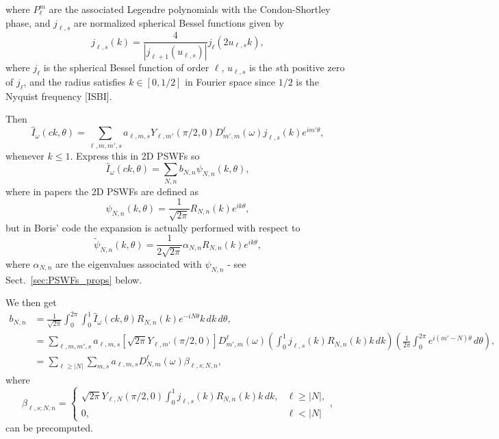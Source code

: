 \documentclass[english,11pt]{article}
\newcommand{\1}{\mathbf{1}}
\newcommand{\TODO}[1]{{\color{red}{[#1]}}}
\numberwithin{equation}{section}
\theoremstyle{plain}
\theoremstyle{definition}
\theoremstyle{remark}
\theoremstyle{plain}
\theoremstyle{remark}
\theoremstyle{plain}
\theoremstyle{plain}
\begin{document}
where $P_{\ell}^m$ are the associated Legendre polynomials with the Condon-Shortley phase, and $j_{\ell,s}$ are normalized spherical Bessel functions given by
\[ j_{\ell, s}(k) = \frac{4}{|j_{\ell+1}(u_{\ell, s})|}j_{\ell}(2u_{\ell,s} k),\]
where $j_{\ell}$ is the spherical Bessel function of order $\ell$, $u_{\ell,s}$ is the $s$th positive zero of $j_{\ell}$, and the radius satisfies $k\in[0,1/2]$ in Fourier space since $1/2$ is the Nyquist frequency [ISBI].

Then
\[ \widehat I_{\omega}(ck,\theta) = \sum_{\ell,m,m',s}a_{\ell,m,s}Y_{\ell,m'}(\pi/2,0)D_{m',m}^{\ell}(\omega)j_{\ell,s}(k)e^{im'\theta},\]
whenever $k\leq 1$. Express this in 2D PSWFs so \TODO{Eitan: I stopped here}
\[ \widehat I_{\omega}(ck,\theta) = \sum_{N,n}b_{N,n}\psi_{N,n}(k,\theta),\]
where in papers the 2D PSWFs are defined as
\[ \psi_{N,n}(k,\theta) = \frac{1}{\sqrt{2\pi}}R_{N,n}(k)e^{ik\theta},\]
but in Boris' code the expansion is actually performed with respect to
\[ \widetilde\psi_{N,n}(k,\theta) = \frac{1}{2\sqrt{2\pi}}\alpha_{N,n}R_{N,n}(k)e^{ik\theta},\]
where $\alpha_{N,n}$ are the eigenvalues associated with $\psi_{N,n}$ - see Sect.~\ref{sec:PSWFs_props} below. 

We then get
\[\begin{aligned} b_{N,n} &= \frac{1}{\sqrt{2\pi}}\int_0^{2\pi}\int_0^1\widehat I_{\omega}(ck,\theta)R_{N,n}(k)e^{-iN\theta}k\, dk\, d\theta,\\
&= \sum_{\ell,m,m',s}a_{\ell,m,s}[\sqrt{2\pi}Y_{\ell,m'}(\pi/2,0)]D_{m',m}^{\ell}(\omega)\left(\int_0^1j_{\ell,s}(k)R_{N,n}(k)k\, dk\right)\left(\frac{1}{2\pi}\int_0^{2\pi}e^{i(m'-N)\theta}\, d\theta\right),\\
&= \sum_{\ell\geq |N|}\sum_{m,s}a_{\ell,m,s}D_{N,m}^{\ell}(\omega)\beta_{\ell,s;N,n},\end{aligned}\]
where
\[ \beta_{\ell,s;N,n} = \left\{\begin{array}{ll} \sqrt{2\pi}Y_{\ell,N}(\pi/2,0)\int_0^1j_{\ell,s}(k)R_{N,n}(k)k\, dk, & \ell\geq |N|,\\ 0, & \ell<|N|\end{array}\right.,\]
can be precomputed.
\end{document}
